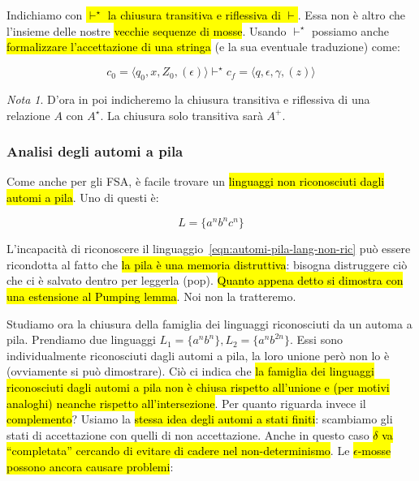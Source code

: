 \documentclass[a4paper,11pt,twoside]{article}
\theoremstyle{plain}
\theoremstyle{definition}
\theoremstyle{remark}
\newtheorem*{nota}{Nota}
\begin{document}
Indichiamo con \hl{$\vdash^\star$ la chiusura transitiva e riflessiva di
$\vdash$}. Essa non è altro che l'insieme delle nostre \hl{vecchie sequenze di
mosse}. Usando $\vdash^\star$ possiamo anche \hl{formalizzare l'accettazione di
una stringa} (e la sua eventuale traduzione) come:

\begin{equation}
  c_0 = \langle q_0, x, Z_0, (\epsilon) \rangle \vdash^\star
    c_f = \langle q, \epsilon, \gamma , (z) \rangle
\end{equation}

\begin{nota}
  D'ora in poi indicheremo la chiusura transitiva e riflessiva di una relazione
  $A$ con $A^\star$. La chiusura solo transitiva sarà $A^+$.
\end{nota}

\subsubsection{Analisi degli automi a pila}\label{sec:automi-pila-analisi}

Come anche per gli FSA, è facile trovare un \hl{linguaggi non riconosciuti dagli
automi a pila}. Uno di questi è:

\begin{equation}
  L = \{ a^n b^n c^n \}\label{eqn:automi-pila-lang-non-ric}
\end{equation}

L'incapacità di riconoscere il linguaggio~\ref{eqn:automi-pila-lang-non-ric} può
essere ricondotta al fatto che \hl{la pila è una memoria distruttiva}: bisogna
distruggere ciò che ci è salvato dentro per leggerla (pop). \hl{Quanto appena
detto si dimostra con una estensione al Pumping lemma}. Noi non la tratteremo.

Studiamo ora la chiusura della famiglia dei linguaggi riconosciuti da un automa
a pila. Prendiamo due linguaggi $L_1 = \{ a^n b^n \}, L_2 = \{ a^n b^{2n} \}$.
Essi sono individualmente riconosciuti dagli automi a pila, la loro unione però
non lo è (ovviamente si può dimostrare). Ciò ci indica che \hl{la famiglia dei
linguaggi riconosciuti dagli automi a pila non è chiusa rispetto all'unione e
(per motivi analoghi) neanche rispetto all'intersezione}. Per quanto riguarda
invece il \hl{complemento}? Usiamo la \hl{stessa idea degli automi a stati
finiti}: scambiamo gli stati di accettazione con quelli di non accettazione.
Anche in questo caso \hl{$\delta$ va ``completata'' cercando di evitare di
cadere nel non-determinismo}. Le \hl{$\epsilon$-mosse possono ancora causare
problemi}:
\end{document}
